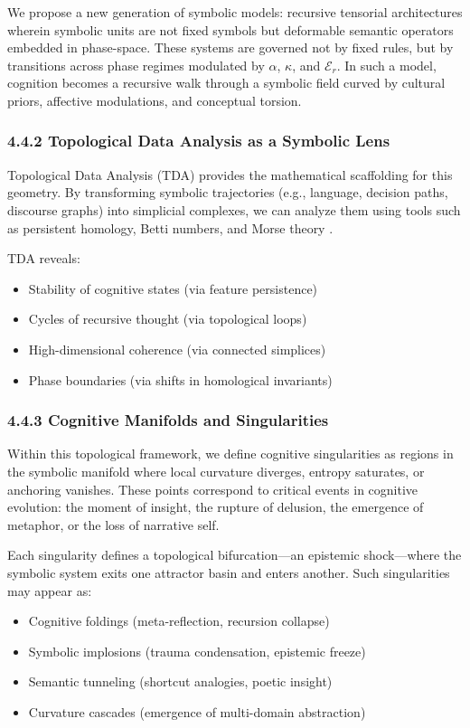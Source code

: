 We propose a new generation of symbolic models: recursive tensorial architectures wherein symbolic units are not fixed symbols but deformable semantic operators embedded in phase-space. These systems are governed not by fixed rules, but by transitions across phase regimes modulated by $\alpha$, $\kappa$, and $\mathcal{E}_r$. In such a model, cognition becomes a recursive walk through a symbolic field curved by cultural priors, affective modulations, and conceptual torsion.

\subsubsection*{4.4.2 Topological Data Analysis as a Symbolic Lens}

Topological Data Analysis (TDA) provides the mathematical scaffolding for this geometry. By transforming symbolic trajectories (e.g., language, decision paths, discourse graphs) into simplicial complexes, we can analyze them using tools such as persistent homology, Betti numbers, and Morse theory \cite{carlsson2009topology, giusti2016two, petri2014homological}.

TDA reveals:
\begin{itemize}
\item Stability of cognitive states (via feature persistence)
\item Cycles of recursive thought (via topological loops)
\item High-dimensional coherence (via connected simplices)
\item Phase boundaries (via shifts in homological invariants)
\end{itemize}

\subsubsection*{4.4.3 Cognitive Manifolds and Singularities}

Within this topological framework, we define cognitive singularities as regions in the symbolic manifold where local curvature diverges, entropy saturates, or anchoring vanishes. These points correspond to critical events in cognitive evolution: the moment of insight, the rupture of delusion, the emergence of metaphor, or the loss of narrative self.

Each singularity defines a topological bifurcation—an epistemic shock—where the symbolic system exits one attractor basin and enters another. Such singularities may appear as:
\begin{itemize}
\item Cognitive foldings (meta-reflection, recursion collapse)
\item Symbolic implosions (trauma condensation, epistemic freeze)
\item Semantic tunneling (shortcut analogies, poetic insight)
\item Curvature cascades (emergence of multi-domain abstraction)
\end{itemize}


